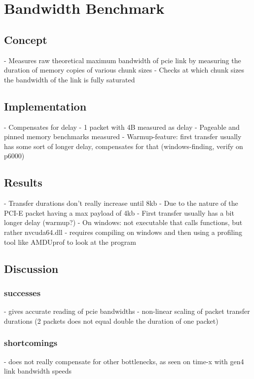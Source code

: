 
\chapter{Bandwidth Benchmark}\label{chapter:benchmark}

\section{Concept}
- Measures raw theoretical maximum bandwidth of pcie link by measuring the duration of memory copies of various chunk sizes
- Checks at which chunk sizes the bandwidth of the link is fully saturated

\section{Implementation}
- Compensates for delay - 1 packet with 4B measured as delay
- Pageable and pinned memory benchmarks measured
- Warmup-feature: first transfer usually has some sort of longer delay, compensates for that (windows-finding, verify on p6000)

\section{Results}
- Transfer durations don’t really increase until 8kb
- Due to the nature of the PCI-E packet having a max payload of 4kb
- First transfer usually has a bit longer delay (warmup?)
- On windows: not executable that calls functions, but rather nvcuda64.dll - requires compiling on windows and then using a profiling tool like AMDUprof to look at the program

\section{Discussion}

\subsection{successes}
- gives accurate reading of pcie bandwidths 
- non-linear scaling of packet transfer durations (2 packets does not equal double the duration of one packet)


\subsection{shortcomings}
- does not really compensate for other bottlenecks, as seen on time-x with gen4 link bandwidth speeds
